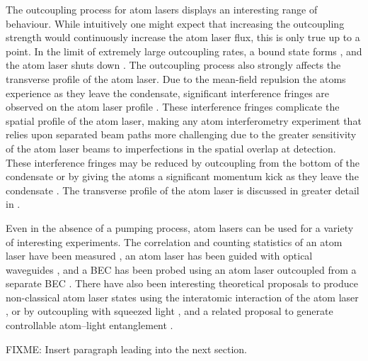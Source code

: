 The outcoupling process for atom lasers displays an interesting range of behaviour.  While intuitively one might expect that increasing the outcoupling strength would continuously increase the atom laser flux, this is only true up to a point.  In the limit of extremely large outcoupling rates, a bound state forms \citep{Jeffers:2000rr}, and the atom laser shuts down \citep{Robins:2004pz}.  The outcoupling process also strongly affects the transverse profile of the atom laser.  Due to the mean-field repulsion the atoms experience as they leave the condensate, significant interference fringes are observed on the atom laser profile \citep{Busch:2002zr,Kohl:2005fk}.  These interference fringes complicate the spatial profile of the atom laser, making any atom interferometry experiment that relies upon separated beam paths more challenging due to the greater sensitivity of the atom laser beams to imperfections in the spatial overlap at detection.  These interference fringes may be reduced by outcoupling from the bottom of the condensate \citep{Riou:2006uq} or by giving the atoms a significant momentum kick as they leave the condensate \citep{Jeppesen:2008}.  The transverse profile of the atom laser is discussed in greater detail in .

Even in the absence of a pumping process, atom lasers can be used for a variety of interesting experiments.  The correlation and counting statistics of an atom laser have been measured \citep{Ottl:2005}, an atom laser has been guided with optical waveguides \citep{Guerin:2006mz}, and a BEC has been probed using an atom laser outcoupled from a separate BEC \citep{Doring:2008}.  There have also been interesting theoretical proposals to produce non-classical atom laser states using the interatomic interaction of the atom laser \citep{Johnsson:2007b}, or by outcoupling with squeezed light \citep{Haine:2005}, and a related proposal to generate controllable atom--light entanglement \citep{Haine:2006}.

FIXME: Insert paragraph leading into the next section.

% 
% 

